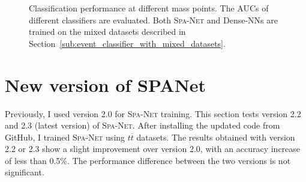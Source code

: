 \documentclass[12pt]{article}
\begin{document}
        \begin{figure}[htpb]
            \centering
            \caption{Classification performance at different mass points. The AUCs of different classifiers are evaluated. Both \textsc{Spa-Net} and Dense-NNs are trained on the mixed datasets described in Section~\ref{sub:event_classifier_with_mixed_datasets}.}  
            \label{fig:classification_performance_each_mass_point}  
        \end{figure}
\section{New version of SPANet}%
\label{sec:new_verion_of_spanet}
    Previously, I used version 2.0 for \textsc{Spa-Net} training. This section tests version 2.2 and 2.3 (latest version) of \textsc{Spa-Net}. After installing the updated code from GitHub, I trained \textsc{Spa-Net} using $t \overline{t}$ datasets. The results obtained with version 2.2 or 2.3 show a slight improvement over version 2.0, with an accuracy increase of less than 0.5\%. The performance difference between the two versions is not significant.
\end{document}
